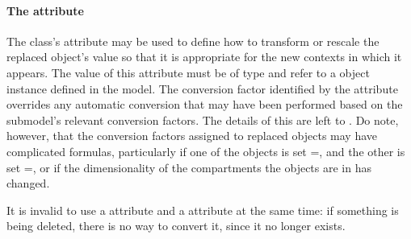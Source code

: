 %


\paragraph{The \fixttspace{} attribute}
\label{replacedelement-conversionfactor}

The \ReplacedElement class's  attribute may be used to
define how to transform or rescale the replaced object's value so that
it is appropriate for the new contexts in which it appears.  The value
of this attribute must be of type  and refer to a
\Parameter object instance defined in the model.  The conversion factor
identified by the  attribute overrides any
automatic conversion that may have been performed based on the
submodel's relevant conversion factors.  The details of this are left to
.  Do note, however, that the conversion 
factors assigned to replaced \Species objects may have complicated formulas,
particularly if one of the objects is set =,
and the other is set =, or if 
the dimensionality of the compartments the objects are in has changed.

It is invalid to use a 
attribute and a  attribute at the same time:  if something
is being deleted, there is no way to convert it, since it no longer exists.


